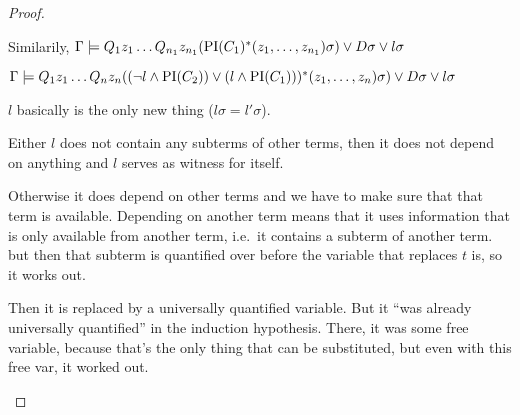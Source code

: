 \begin{proof}
{\begin{description}
			Similarily,
			$\Gamma \models Q_1 z_1 \ldots Q_{n_1} z_{n_1} (\mathrm{PI}(C_1)^*(z_1, \ldots, z_{n_1})\sigma)  \lor D\sigma \lor l\sigma$

			$\Gamma \models Q_1 z_1 \ldots Q_{n} z_{n} ( (\lnot l \land \mathrm{PI}(C_2)) \lor (l \land \mathrm{PI}(C_1))) ^*(z_1, \ldots, z_{n})\sigma)  \lor D\sigma \lor l\sigma$

			$l$ basically is the only new thing ($l\sigma = l'\sigma$).

			Either $l$ does not contain any subterms of other terms, then it does not depend on anything and $l$ serves as witness for itself.

			Otherwise it does depend on other terms and we have to make sure that that term is available.
			Depending on another term means that it uses information that is only available from another term,
			i.e.~it contains a subterm of another term. but then that subterm is quantified over before the variable that replaces $t$ is, so it works out.


		\item [$t$ is $\Delta$-colored.]
			Then it is replaced by a universally quantified variable.
			But it ``was already universally quantified'' in the induction hypothesis.
			There, it was some free variable, because that's the only thing that can be substituted, but even with this free var, it worked out.


			

		\end{description}

	}

\end{proof}

